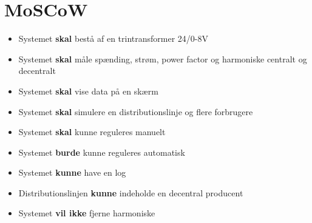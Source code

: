 
\section{MoSCoW}

\begin{itemize}
\item{Systemet \textbf{skal} bestå af en trintransformer 24/0-8V}
\item{Systemet \textbf{skal} måle spænding, strøm, power factor og harmoniske centralt og decentralt}
\item{Systemet \textbf{skal} vise data på en skærm}
\item{Systemet \textbf{skal} simulere en distributionslinje og flere forbrugere}
\item{Systemet \textbf{skal} kunne reguleres manuelt}
\item{Systemet \textbf{burde} kunne reguleres automatisk}
\item{Systemet \textbf{kunne} have en log}
\item{Distributionslinjen \textbf{kunne} indeholde en decentral producent}
\item{Systemet \textbf{vil ikke} fjerne harmoniske} 
\end{itemize}

